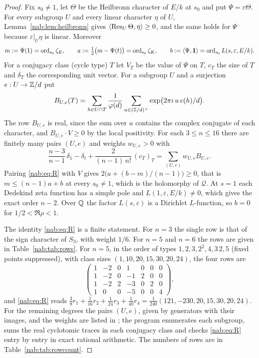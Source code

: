 \begin{proof}
Fix $s_0\ne1$, let $\Theta$ be the Heilbronn character of $E/k$ at $s_0$ and put
$\Psi=\varepsilon\Theta$. For every subgroup $U$ and every linear character $\eta$ of $U$,
Lemma~\ref{nab:lem:heilbronn} gives $\langle\operatorname{Res}_U\Theta,\eta\rangle\ge0$, and the same holds for
$\Psi$ because $\varepsilon|_U\eta$ is linear. Moreover
\[
 m:=\Psi(1)=\operatorname{ord}_{s_0}\zeta_E,\qquad
 a:=\tfrac12\bigl(m-\Psi(t)\bigr)=\operatorname{ord}_{s_0}\zeta_K,\qquad
 b:=\langle\Psi,\mathbf{1}\rangle=\operatorname{ord}_{s_0}L(s,\varepsilon,E/k).
\]
For a conjugacy class (cycle type) $T$ let $V_T$ be the value of $\Psi$ on $T$, $c_T$ the
size of $T$ and $\delta_T$ the corresponding unit vector. For a subgroup $U$ and a
surjection $e:U\to\mathbb{Z}/d$ put
\[
 B_{U,e}(T)=\sum_{h\in U\cap T}\frac1{\varphi(d)}\sum_{u\in(\mathbb{Z}/d)^\times}
   \exp\bigl(2\pi i\,u\,e(h)/d\bigr) .
\]
The row $B_{U,e}$ is real, since the sum over $u$ contains the complex conjugate of each
character, and $B_{U,e}\cdot V\ge0$ by the local positivity. For each $3\le n\le16$ there
are finitely many pairs $(U,e)$ and weights $w_{U,e}>0$ with
\begin{equation}\label{nab:eq:R}
 \frac{n-3}{n-1}\,\delta_1-\delta_t+\frac2{(n-1)\,n!}\,(c_T)_T=\sum_{(U,e)}w_{U,e}B_{U,e} .
\end{equation}
Pairing \eqref{nab:eq:R} with $V$ gives $2\bigl(a+(b-m)/(n-1)\bigr)\ge0$, that is
$m\le(n-1)a+b$ at every $s_0\ne1$, which is the holomorphy of $\mathcal Q$. At $s=1$ each
Dedekind zeta function has a simple pole and $L(1,\varepsilon,E/k)\ne0$, which gives the
exact order $n-2$. Over $\mathbb{Q}$ the factor $L(s,\varepsilon)$ is a Dirichlet $L$-function,
so $b=0$ for $1/2<\Re\rho<1$.

The identity \eqref{nab:eq:R} is a finite statement. For $n=3$ the single row is that of
the sign character of $S_3$, with weight $1/6$. For $n=5$ and $n=6$ the rows are given in
Table~\ref{nab:tab:rows}. For $n=5$, in the order of types $1,2,3,2^2,4,3\,2,5$ (fixed points
suppressed), with class sizes $(1,10,20,15,30,20,24)$, the four rows are
\[
\begin{pmatrix}
1&-2&0&1&0&0&0\\
1&-2&0&-1&2&0&0\\
1&-2&2&-3&0&2&0\\
1&0&0&-5&0&0&4
\end{pmatrix},
\]
and \eqref{nab:eq:R} reads
$\tfrac38r_1+\tfrac1{16}r_2+\tfrac1{24}r_3+\tfrac1{40}r_4
=\tfrac1{240}(121,-230,20,15,30,20,24)$. For the remaining degrees the pairs $(U,e)$, given
by generators with their images, and the weights are listed in
; the
program 
enumerates each subgroup, sums the real cyclotomic traces in each conjugacy class and
checks \eqref{nab:eq:R} entry by entry in exact rational arithmetic. The numbers of rows
are in Table~\ref{nab:tab:rowcount}.


\end{proof}

